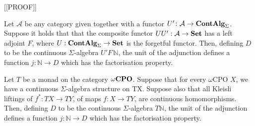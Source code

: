 [[PROOF]]

\begin{alemma}
Let $\mathcal{A}$ be any category given together with a functor $U' \colon \mathcal{A} \to \mathbf{ContAlg}_\Sigma$.
Suppose it holds that that the
composite functor $UU' : \mathcal{A} \to \mathbf{Set}$ has a left adjoint $F$, where $U: \mathbf{ContAlg}_\Sigma \to \mathbf{Set}$ is the forgetful functor.
Then, defining $D$ to be the continuous $\Sigma$-algebra $U' F \, \mathbb{N}$, the unit of the adjunction defines a function
$j \colon \mathbb{N} \to D$ which has the factorisation property.
\end{alemma}
\begin{alemma}
Let $T$ be a monad on the category $\mathbf{{\omega}CPO}$.  Suppose that for every $\omega$CPO $X$, we have a 
continuous $\Sigma$-algebra structure on TX. Suppose also that all Kleisli liftings of 
$f^* \colon TX \to TY$, of maps $f \colon X \to TY$, are  continuous  homomorphisms. Then,
defining $D$ to be the continuous $\Sigma$-algebra $T \mathbb{N}$, the unit of the adjunction defines a function
$j \colon \mathbb{N} \to D$ which has the factorisation property.
\end{alemma}


